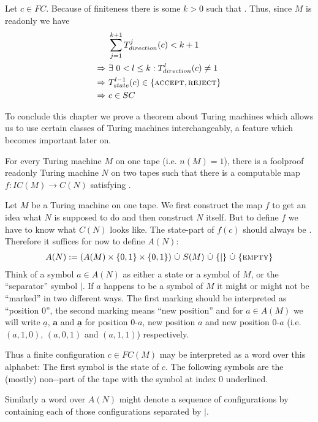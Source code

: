 Let $c \in FC$. Because of finiteness there is some $k > 0$ such that .
Thus, since $M$ is readonly we have
\begin{align*}
	&\sum_{j=1}^{k+1} T_{direction}^j (c) < k+1 \\
	\Rightarrow~&\exists~0 < l \leq k: T_{direction}^l (c) \neq 1 \\
	\Rightarrow~&T_{state}^{l-1} (c) \in \{\text{\scshape{accept}},\text{\scshape{reject}}\} \\
	\Rightarrow~&c \in SC
\end{align*}
\endproof

To conclude this chapter we prove a theorem about Turing machines which allows us to use certain classes of Turing machines interchangeably, a feature which becomes important later on.
\begin{Theorem}
	For every Turing machine $M$ on one tape (i.e. $n(M) = 1$), there is a foolproof readonly Turing machine $N$ on two tapes such that
	there is a computable map $f: IC(M) \to C(N)$
	satisfying .
\end{Theorem}
\proof
	Let $M$ be a Turing machine on one tape.
	We first construct the map $f$ to get an idea what $N$ is supposed to do and then construct $N$ itself.
	But to define $f$ we have to know what $C(N)$ looks like.
	The state-part of $f(c)$ should always be \INI. Therefore it suffices for now to define $A(N)$:
	\begin{align*}
		A(N) := (A(M) \times \{0,1\} \times \{0,1\})~\dot\cup~S(M)~\dot\cup~\{|\}~\dot\cup~\{\text{\scshape{empty}}\}
	\end{align*}
	Think of a symbol $a \in A(N)$ as either a state or a symbol of $M$, or the ``separator'' symbol $|$.
	If $a$ happens to be a symbol of $M$ it might or might not be ``marked'' in two different ways.
	The first marking should be interpreted as ``position $0$'', the second marking means ``new position''
	and for $a \in A(M)$ we will write
	$\underline{a}$, $\boldsymbol{a}$ and $\underline{\boldsymbol{a}}$ for position $0$-$a$, new position $a$ and new position $0$-$a$ (i.e. $(a,1,0)$, $(a,0,1)$ and $(a,1,1)$) respectively.

	Thus a finite configuration $c \in FC(M)$ may be interpreted as a word over this alphabet:
	The first symbol is the state of $c$. The following symbols are the (mostly) non-\EMP-part of the tape with the symbol at index $0$ underlined.

	Similarly a word over $A(N)$ might denote a sequence of configurations by containing each of those configurations separated by $|$.

